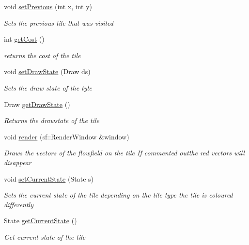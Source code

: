 \begin{DoxyCompactItemize}
void \mbox{\hyperlink{class_tile_a9358e7dd4f3537140f0d03fb24663b7c}{set\+Previous}} (int x, int y)
\begin{DoxyCompactList}\small\item\em Sets the previous tile that was visited \end{DoxyCompactList}\item 
int \mbox{\hyperlink{class_tile_a80b48572e18fc5b34c0e707302d97d8c}{get\+Cost}} ()
\begin{DoxyCompactList}\small\item\em returns the cost of the tile \end{DoxyCompactList}\item 
void \mbox{\hyperlink{class_tile_a4a26f555d4268b105e94dc789fe4a74d}{set\+Draw\+State}} (Draw ds)
\begin{DoxyCompactList}\small\item\em Sets the draw state of the tyle \end{DoxyCompactList}\item 
Draw \mbox{\hyperlink{class_tile_af8db5d7a281dab571aaec3efbb2758c2}{get\+Draw\+State}} ()
\begin{DoxyCompactList}\small\item\em Returns the drawstate of the tile \end{DoxyCompactList}\item 
void \mbox{\hyperlink{class_tile_a57444de210a362d359197d5a6b5e16e9}{render}} (sf\+::\+Render\+Window \&window)
\begin{DoxyCompactList}\small\item\em Draws the vectors of the flowfield on the tile If commented outthe red vectors will disappear \end{DoxyCompactList}\item 
void \mbox{\hyperlink{class_tile_aa5028a9f698e54f7c0263a255ec99732}{set\+Current\+State}} (State s)
\begin{DoxyCompactList}\small\item\em Sets the current state of the tile depending on the tile type the tile is coloured differently \end{DoxyCompactList}\item 
State \mbox{\hyperlink{class_tile_a429ce5c06e30fccbc94c5f0a0bcc53c5}{get\+Current\+State}} ()
\begin{DoxyCompactList}\small\item\em Get current state of the tile \end{DoxyCompactList}\end{DoxyCompactItemize}
